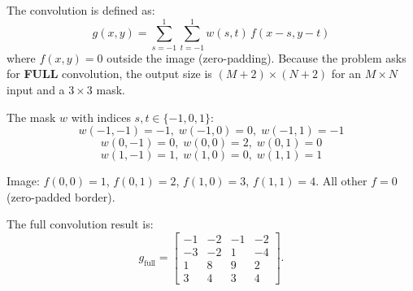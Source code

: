 \documentclass[12pt]{article}
\begin{document}
\vspace{0.5cm}

\begin{stepbox}
The convolution is defined as:
\[
g(x,y) = \sum_{s=-1}^{1}\sum_{t=-1}^{1} w(s,t)\, f(x-s, y-t)
\]
where $f(x,y) = 0$ outside the image (zero-padding). Because the problem asks for \textbf{FULL} convolution, the output size is $(M+2)\times(N+2)$ for an $M\times N$ input and a $3\times3$ mask.

The mask $w$ with indices $s,t \in \{-1, 0, 1\}$:
\[
w(-1,-1) = -1,\; w(-1,0) = 0,\; w(-1,1) = -1
\]
\[
w(0,-1) = 0,\; w(0,0) = 2,\; w(0,1) = 0
\]
\[
w(1,-1) = 1,\; w(1,0) = 0,\; w(1,1) = 1
\]
\end{stepbox}

\begin{stepbox}
Image: $f(0,0) = 1$, $f(0,1) = 2$, $f(1,0) = 3$, $f(1,1) = 4$. All other $f = 0$ (zero-padded border).

The full convolution result is:
\[
g_{\text{full}}=
\begin{bmatrix}
-1 & -2 & -1 & -2 \\
-3 & -2 & 1 & -4 \\
1 & 8 & 9 & 2 \\
3 & 4 & 3 & 4
\end{bmatrix}.
\]
\end{stepbox}

\begin{stepbox}
\begin{center}
\end{center}
\end{stepbox}
\end{document}
